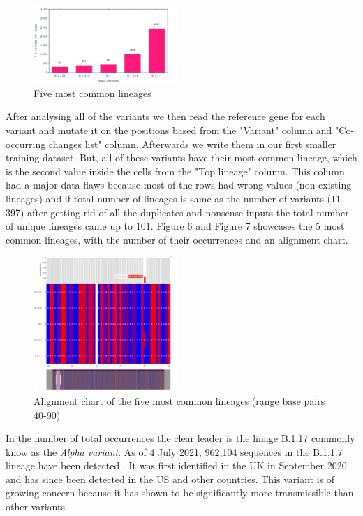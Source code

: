 \documentclass[conference,compsoc]{IEEEtran}
\begin{document}
\begin{figure}[h]
    \centering
    \includegraphics[width=0.485\textwidth]{images/fig6-common_linages.jpg.png}
    \caption{Five most common lineages}
    \label{fig6}
\end{figure}

After analysing all of the variants we then read the reference gene for each variant and mutate it on the positions based from the "Variant" column and "Co-occurring changes list" column. Afterwards we write them in our first smaller training dataset. But, all of these variants have their most common lineage, which is the second value inside the cells from the "Top lineage" column. This column had a major data flaws because most of the rows had wrong values (non-existing lineages) and if total number of lineages is same as the number of variants (11 397) after getting rid of all the duplicates and nonsense inputs the total number of unique lineages came up to 101. Figure 6 and Figure 7 showcases the 5 most common lineages, with the number of their occurrences and an alignment chart. 

\begin{figure}[h]
    \centering
    \includegraphics[width=0.485\textwidth]{images/fig7-aligment_chart.png}
    \caption{Alignment chart of the five most common lineages (range base pairs 40-90)}
    \label{fig7}
\end{figure}

In the number of total occurrences the clear leader is the linage B.1.17 \cite{ref18} commonly know as the \textit{Alpha variant}. 
As of 4 July 2021, 962,104 sequences in the B.1.1.7 lineage have been detected \cite{ref19}. It was first identified in the UK in September 2020 and has since been detected in the US \cite{ref20} and other countries. This variant is of growing concern because it has shown to be significantly more transmissible than other variants. 
\end{document}
